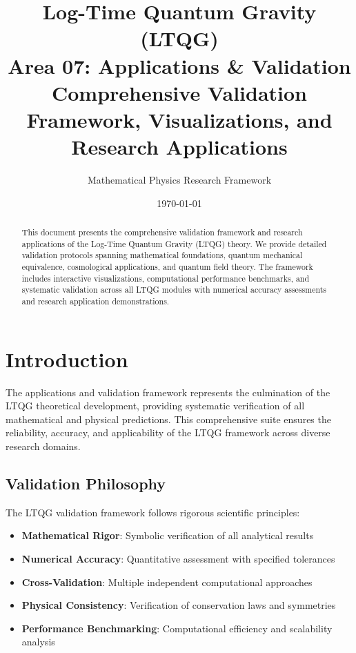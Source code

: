 \documentclass[11pt,a4paper]{article}
\title{\textbf{Log-Time Quantum Gravity (LTQG)}\\
\Large Area 07: Applications \& Validation\\
\large Comprehensive Validation Framework, Visualizations, and Research Applications}
\author{Mathematical Physics Research Framework}
\date{\today}
\theoremstyle{definition}
\theoremstyle{remark}
\begin{document}
\maketitle

\begin{abstract}
This document presents the comprehensive validation framework and research applications of the Log-Time Quantum Gravity (LTQG) theory. We provide detailed validation protocols spanning mathematical foundations, quantum mechanical equivalence, cosmological applications, and quantum field theory. The framework includes interactive visualizations, computational performance benchmarks, and systematic validation across all LTQG modules with numerical accuracy assessments and research application demonstrations.
\end{abstract}

\tableofcontents
\newpage

\section{Introduction}

The applications and validation framework represents the culmination of the LTQG theoretical development, providing systematic verification of all mathematical and physical predictions. This comprehensive suite ensures the reliability, accuracy, and applicability of the LTQG framework across diverse research domains.

\subsection{Validation Philosophy}

The LTQG validation framework follows rigorous scientific principles:
\begin{itemize}
\item \textbf{Mathematical Rigor}: Symbolic verification of all analytical results
\item \textbf{Numerical Accuracy}: Quantitative assessment with specified tolerances
\item \textbf{Cross-Validation}: Multiple independent computational approaches
\item \textbf{Physical Consistency}: Verification of conservation laws and symmetries
\item \textbf{Performance Benchmarking}: Computational efficiency and scalability analysis
\end{itemize}
\end{document}
